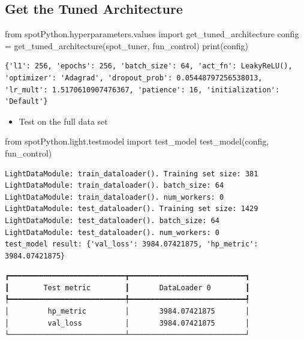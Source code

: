 \documentclass[
  letterpaper,
  DIV=11,
  numbers=noendperiod]{scrreprt}
\newenvironment{Shaded}{\begin{snugshade}}{\end{snugshade}}
\newcommand{\BuiltInTok}[1]{\textcolor[rgb]{0.00,0.23,0.31}{#1}}
\newcommand{\ImportTok}[1]{\textcolor[rgb]{0.00,0.46,0.62}{#1}}
\newcommand{\NormalTok}[1]{\textcolor[rgb]{0.00,0.23,0.31}{#1}}
\newcommand{\OperatorTok}[1]{\textcolor[rgb]{0.37,0.37,0.37}{#1}}
\providecommand{\tightlist}{%
  \setlength{\itemsep}{0pt}\setlength{\parskip}{0pt}}\usepackage{longtable,booktabs,array}
\begin{document}
\subsection{Get the Tuned Architecture}\label{sec-get-spot-results-31}

\begin{Shaded}
\begin{Highlighting}[]
\ImportTok{from}\NormalTok{ spotPython.hyperparameters.values }\ImportTok{import}\NormalTok{ get\_tuned\_architecture}
\NormalTok{config }\OperatorTok{=}\NormalTok{ get\_tuned\_architecture(spot\_tuner, fun\_control)}
\BuiltInTok{print}\NormalTok{(config)}
\end{Highlighting}
\end{Shaded}

\begin{verbatim}
{'l1': 256, 'epochs': 256, 'batch_size': 64, 'act_fn': LeakyReLU(), 'optimizer': 'Adagrad', 'dropout_prob': 0.05448797256538013, 'lr_mult': 1.5170610907476367, 'patience': 16, 'initialization': 'Default'}
\end{verbatim}

\begin{itemize}
\tightlist
\item
  Test on the full data set
\end{itemize}

\begin{Shaded}
\begin{Highlighting}[]
\ImportTok{from}\NormalTok{ spotPython.light.testmodel }\ImportTok{import}\NormalTok{ test\_model}
\NormalTok{test\_model(config, fun\_control)}
\end{Highlighting}
\end{Shaded}

\begin{verbatim}
LightDataModule: train_dataloader(). Training set size: 381
LightDataModule: train_dataloader(). batch_size: 64
LightDataModule: train_dataloader(). num_workers: 0
LightDataModule: test_dataloader(). Training set size: 1429
LightDataModule: test_dataloader(). batch_size: 64
LightDataModule: test_dataloader(). num_workers: 0
test_model result: {'val_loss': 3984.07421875, 'hp_metric': 3984.07421875}
\end{verbatim}

\begin{verbatim}
┏━━━━━━━━━━━━━━━━━━━━━━━━━━━┳━━━━━━━━━━━━━━━━━━━━━━━━━━━┓
┃        Test metric        ┃       DataLoader 0        ┃
┡━━━━━━━━━━━━━━━━━━━━━━━━━━━╇━━━━━━━━━━━━━━━━━━━━━━━━━━━┩
│         hp_metric         │       3984.07421875       │
│         val_loss          │       3984.07421875       │
└───────────────────────────┴───────────────────────────┘
\end{verbatim}
\end{document}
